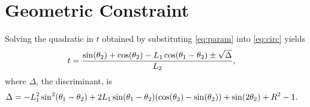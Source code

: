 \documentclass[12pt,a4paper]{article}
\let\originalleft\left
\let\originalright\right
\renewcommand{\left}{\mathopen{}\mathclose\bgroup\originalleft}
\renewcommand{\right}{\aftergroup\egroup\originalright}
\begin{document}
\appendix
\section{Geometric Constraint}
\label{sec:geo}
Solving the quadratic in $t$ obtained by substituting \eqref{eq:param} into \eqref{eq:circ} yields
\begin{align*}
t &= \frac{\sin \left(\theta _2\right)+\cos \left(\theta _2\right)-L_1 \cos \left(\theta _1-\theta _2\right)\pm\sqrt{\Delta}}{L_2},
\end{align*}
where $\Delta$, the discriminant, is
\begin{align*}
\Delta &= -L_1^2 \sin ^2\left(\theta _1-\theta _2\right)+2 L_1 \sin \left(\theta _1-\theta _2\right) \left(\cos \left(\theta _2\right)-\sin \left(\theta _2\right)\right)+\sin \left(2 \theta _2\right)+R^2-1.
\end{align*}


%
\end{document}
